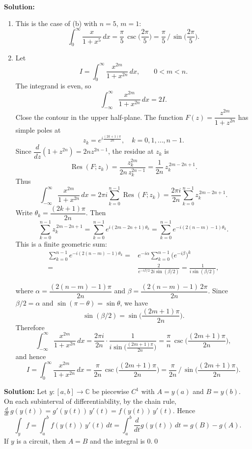 \bigskip\noindent\textbf{Solution:}
\begin{enumerate}[label=(\alph*)]
\item This is the case of (b) with $n=5$, $m=1$:
\[\int_0^{\infty}\frac{x}{1+x^5}\,dx=\frac{\pi}{5}\,\csc\!\Big(\frac{2\pi}{5}\Big)=\frac{\pi}{5}\,\Big/\,\sin\!\Big(\frac{2\pi}{5}\Big).\]

\item Let
\[I=\int_0^{\infty}\frac{x^{2m}}{1+x^{2n}}\,dx,\qquad 0<m<n.\]
The integrand is even, so
\[\int_{-\infty}^{\infty}\frac{x^{2m}}{1+x^{2n}}\,dx=2I.\]
Close the contour in the upper half-plane. The function $F(z)=\dfrac{z^{2m}}{1+z^{2n}}$ has simple poles at
\[z_k=e^{i\frac{(2k+1)\pi}{2n}},\quad k=0,1,\dots,n-1.\]
Since $\dfrac{d}{dz}(1+z^{2n})=2n z^{2n-1}$, the residue at $z_k$ is
\[\operatorname{Res}(F;z_k)=\frac{z_k^{2m}}{2n\,z_k^{2n-1}}=\frac{1}{2n}\,z_k^{\,2m-2n+1}.\]
Thus
\[\int_{-\infty}^{\infty}\frac{x^{2m}}{1+x^{2n}}\,dx=2\pi i\sum_{k=0}^{n-1}\operatorname{Res}(F;z_k)=\frac{2\pi i}{2n}\sum_{k=0}^{n-1} z_k^{\,2m-2n+1}.\]
Write $\theta_k=\dfrac{(2k+1)\pi}{2n}$. Then
\[\sum_{k=0}^{n-1} z_k^{\,2m-2n+1}=\sum_{k=0}^{n-1} e^{i(2m-2n+1)\theta_k}=\sum_{k=0}^{n-1} e^{-i(2(n-m)-1)\theta_k}.
\]
This is a finite geometric sum:
\begin{align*}
\sum_{k=0}^{n-1} e^{-i(2(n-m)-1)\theta_k}=& e^{-i\alpha}\sum_{k=0}^{n-1} \Big(e^{-i\beta}\Big)^k \\
=&\frac{2}{e^{-i\beta/2}\,2i\sin(\beta/2)}=\frac{1}{i\sin(\beta/2)},
\end{align*}

where $\alpha=\dfrac{(2(n-m)-1)\pi}{2n}$ and $\beta=\dfrac{(2(n-m)-1)\,2\pi}{2n}$. Since $\beta/2=\alpha$ and $\sin(\pi-\theta)=\sin\theta$, we have
\[\sin(\beta/2)=\sin\!\Big(\frac{(2m+1)\pi}{2n}\Big).\]
Therefore
\[\int_{-\infty}^{\infty}\frac{x^{2m}}{1+x^{2n}}\,dx=\frac{2\pi i}{2n}\cdot\frac{1}{i\sin\!\big(\frac{(2m+1)\pi}{2n}\big)}=\frac{\pi}{n}\,\csc\!\Big(\frac{(2m+1)\pi}{2n}\Big),\]
and hence
\[I=\int_0^{\infty}\frac{x^{2m}}{1+x^{2n}}\,dx=\frac{\pi}{2n}\,\csc\!\Big(\frac{(2m+1)\pi}{2n}\Big)=\frac{\pi}{2n}\,\Big/\,\sin\!\Big(\frac{(2m+1)\pi}{2n}\Big).\]
\end{enumerate}


\bigskip\noindent\textbf{Solution:}
Let $y:[a,b]\to\mathbb C$ be piecewise $C^1$ with $A=y(a)$ and $B=y(b)$. On each subinterval of differentiability, by the chain rule, $\frac{d}{dt}\,g(y(t))=g'(y(t))\,y'(t)=f(y(t))\,y'(t)$. Hence
\[\int_y f=\int_a^b f(y(t))\,y'(t)\,dt=\int_a^b \frac{d}{dt}g(y(t))\,dt=g(B)-g(A).\]
If $y$ is a circuit, then $A=B$ and the integral is $0$.\qed


